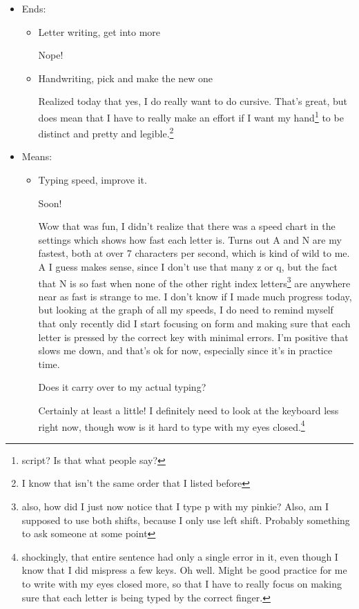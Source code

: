 \documentclass[12pt]{article}
\renewcommand{\,}{\textsuperscript{,}}
\begin{document}
\begin{itemize}
\begin{itemize}

\item Ends:

\begin{itemize}

\item Letter writing, get into more

Nope!

\item Handwriting, pick and make the new one

Realized today that yes, I do really want to do cursive.  
That's great, but does mean that I have to really make an effort if I want my hand\footnote{script? Is that what people say?} to be distinct and pretty and legible.\footnote{I know that isn't the same order that I listed before}

\end{itemize}

\item Means:

\begin{itemize}

\item Typing speed, improve it.

Soon!

Wow that was fun, I didn't realize that there was a speed chart in the settings which shows how fast each letter is.  
Turns out A and N are my fastest, both at over 7 characters per second, which is kind of wild to me. A I guess makes sense, since I don't use that many z or q, but the fact that N is so fast when none of the other right index letters\footnote{also, how did I just now notice that I type p with my pinkie? Also, am I supposed to use both shifts, because I only use left shift. Probably something to ask someone at some point} are anywhere near as fast is strange to me.  
I don't know if I made much progress today, but looking at the graph of all my speeds, I do need to remind myself that only recently did I start focusing on form and making sure that each letter is pressed by the correct key with minimal errors.  
I'm positive that slows me down, and that's ok for now, especially since it's in practice time.

Does it carry over to my actual typing?

Certainly at least a little! I definitely need to look at the keyboard less right now, though wow is it hard to type with my eyes closed.\footnote{shockingly, that entire sentence had only a single error in it, even though I know that I did mispress a few keys. Oh well. Might be good practice for me to write with my eyes closed more, so that I have to really focus on making sure that each letter is being typed by the correct finger.}


\end{itemize}
\end{itemize}
\end{itemize}
\end{document}
